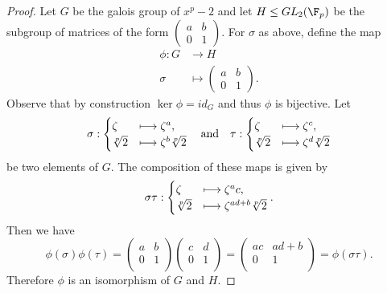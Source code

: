 \documentclass[10pt]{amsart}
\begin{document}
\begin{thm}
  \begin{proof}
    Let $G$ be the galois group of $x^p - 2$ and let $H \leq GL_2(\F_p)$ be the subgroup of matrices of the form 
    $
    \begin{pmatrix}
      a & b\\
      0 & 1
    \end{pmatrix}.
    $
    For $\sigma$ as above, define the map 
    \begin{align*}
      \phi : G &\longrightarrow H\\
      \sigma &\longmapsto \begin{pmatrix}
        a & b\\
        0 & 1
      \end{pmatrix}.
    \end{align*}
    Observe that by construction $\ker\phi = id_G$ and thus $\phi$ is bijective.
        Let 
    $$\sigma : \begin{cases}
      \zeta &\longmapsto \zeta^a,\\
      \sqrt[p]{2} &\longmapsto \zeta^b\sqrt[p]{2}
    \end{cases} 
    \quad \text{and} \quad 
    \tau : \begin{cases}
      \zeta &\longmapsto \zeta^c,\\
      \sqrt[p]{2} &\longmapsto \zeta^d\sqrt[p]{2}
    \end{cases}
    $$
    be two elements of $G$.
    The composition of these maps is given by
    $$\sigma\tau : \begin{cases}
      \zeta &\longmapsto \zeta^ac,\\
      \sqrt[p]{2} &\longmapsto \zeta^{ad+b}\sqrt[p]{2}
    \end{cases}.$$
    Then we have 
    $$     
      \phi(\sigma)\phi(\tau) = \begin{pmatrix}
        a & b\\
        0 & 1\\
      \end{pmatrix}
      \begin{pmatrix}
        c & d\\
        0 & 1\\
      \end{pmatrix}
      = \begin{pmatrix}
        ac & ad + b\\
        0 & 1\\
      \end{pmatrix}
      = \phi(\sigma\tau).
      $$
      Therefore $\phi$ is an isomorphism of $G$ and $H$.
  \end{proof}
\end{thm}
\end{document}
